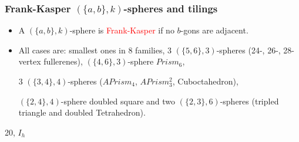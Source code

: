 \documentclass{beamer}
\begin{document}
\begin{frame}\frametitle{Frank-Kasper $(\{a,b\},k)$-spheres and tilings}
\begin{itemize}
\item A $(\{a,b\},k)$-sphere is
 \textcolor{red}{Frank-Kasper} if no $b$-gons are adjacent.
\item  All cases are:  smallest ones in $8$ families, $3$ 
$(\{5,6\},3)$-spheres (24-, 26-, 28-vertex fullerenes),  
$(\{4,6\},3)$-sphere $Prism_6$, 

$3$ 
$(\{3,4\},4)$-spheres
($APrism_4$, $APrism_3^2$,  Cuboctahedron),
  
$(\{2,4\},4)$-sphere doubled square and two  $(\{2,3\},6)$-spheres
 (tripled triangle and doubled Tetrahedron).
\end{itemize}
\begin{center}
\begin{minipage}[b]{24mm}
\centering
{}\par
20, $I_h$
\end{minipage}
\begin{minipage}[b]{24mm}
\centering

\end{minipage}
\end{center}
\end{frame}
\end{document}
